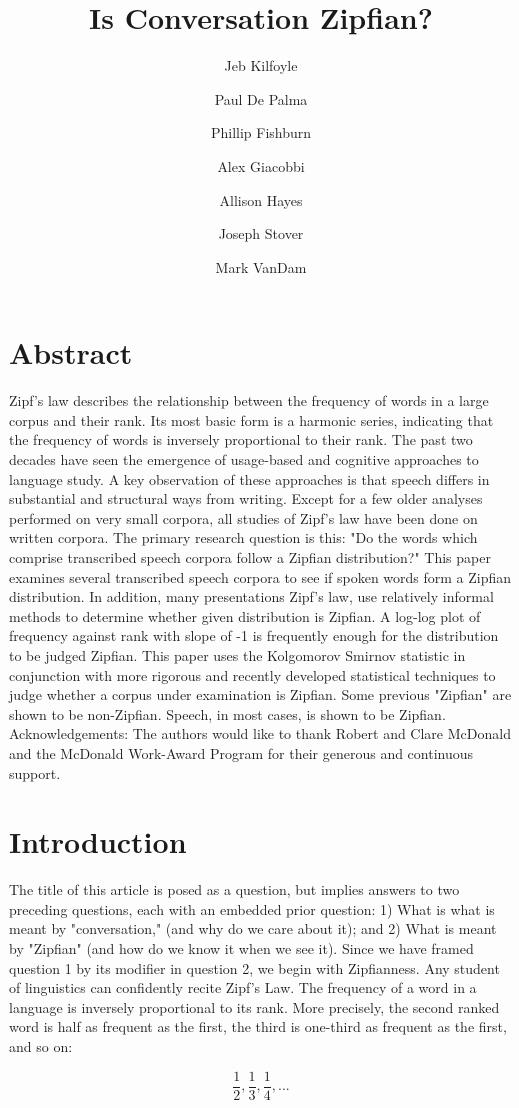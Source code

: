 \documentclass[12pt]{article}
\title{Is Conversation Zipfian?}
\author[1]{{Jeb Kilfoyle}}
\author[1]{Paul De Palma}
\author[1]{Phillip Fishburn}
\author[1]{Alex Giacobbi}
\author[1]{Allison Hayes}
\author[2]{Joseph Stover}
\author[3]{Mark VanDam}
\affil[1]{Department of Computer Science, Gonzaga University}
\affil[2]{Department of Mathematics, Gonzaga University}
\affil[3]{Department of Speech and Hearing Sciences, Washington State University}
\begin{document}
\maketitle  %
\section*{\centering\large Abstract}
\noindent Zipf's law describes the relationship between the frequency of words in a large corpus and their rank.  Its most basic form is a harmonic series, indicating that the frequency of words is inversely proportional to their rank.  The past two decades have seen the emergence of usage-based and cognitive approaches to language study.  A key observation of these approaches is that speech differs in substantial and structural ways from writing.  Except for a few older analyses performed on very small corpora, all studies of Zipf's law have been done on written corpora.  The primary research question is this: "Do the words which comprise transcribed speech corpora follow a Zipfian distribution?"  This paper examines several transcribed speech corpora to see if spoken words form a Zipfian distribution.  In addition, many presentations Zipf's law, use relatively informal methods to determine whether given distribution is Zipfian.  A log-log plot of frequency against rank with slope of -1 is frequently enough for the distribution to be judged Zipfian.  This paper uses the Kolgomorov Smirnov statistic in conjunction with more rigorous and recently developed statistical techniques to judge whether a corpus under examination is Zipfian. Some previous "Zipfian" are shown to be non-Zipfian.  Speech, in most cases, is shown to be Zipfian. \\

\noindent Acknowledgements: The authors would like to thank Robert and Clare McDonald and the McDonald Work-Award Program for their generous and continuous support.


\section{Introduction}

The title of this article is posed as a question, but implies answers to two preceding questions, each with an embedded prior question: 1) What is what is meant by "conversation," (and why do we care about it); and 2) What is meant by "Zipfian" (and how do we know it when we see it).  Since we have framed question 1 by its modifier in question 2, we begin with Zipfianness. Any student of linguistics can confidently recite Zipf's Law.  The frequency of a word in a language is inversely proportional to its rank.  More precisely, the second ranked word is half as frequent as the first, the third is one-third as frequent as the first, and so on:
\begin{center}
\[\frac{1}{2}, \frac{1}{3}, \frac{1}{4},...\]
\end{center}
\end{document}
